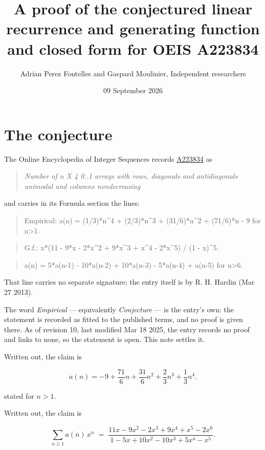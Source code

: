\documentclass[11pt]{article}
\title{A proof of the conjectured linear recurrence and generating function and closed form for OEIS A223834}
\author{Adrian Perez Fontelles and Gaspard Moulinier, Independent researchers}
\date{09 September 2026}
\theoremstyle{definition}
\begin{document}
\maketitle
\section{The conjecture}

The Online Encyclopedia of Integer Sequences records \href{https://oeis.org/A223834}{A223834} as

\begin{quote}\itshape Number of n X 4 0..1 arrays with rows, diagonals and antidiagonals unimodal and columns nondecreasing\end{quote}

and carries in its Formula section the lines:

\begin{quote}\ttfamily Empirical: a(n) = (1/3)*n\textasciicircum{}4 + (2/3)*n\textasciicircum{}3 + (31/6)*n\textasciicircum{}2 + (71/6)*n - 9 for n>1.\end{quote}

\begin{quote}\ttfamily G.f.: x*(11 - 9*x - 2*x\textasciicircum{}2 + 9*x\textasciicircum{}3 + x\textasciicircum{}4 - 2*x\textasciicircum{}5) / (1 - x)\textasciicircum{}5.\end{quote}

\begin{quote}\ttfamily a(n) = 5*a(n-1) - 10*a(n-2) + 10*a(n-3) - 5*a(n-4) + a(n-5) for n>6.\end{quote}

That line carries no separate signature; the entry itself is by R. H. Hardin (Mar 27 2013).

The word {\itshape Empirical} --- equivalently {\itshape Conjecture} --- is the entry's own: the statement is recorded as fitted to the published terms, and no proof is given there. As of revision 10, last modified Mar 18 2025, the entry records no proof and links to none, so the statement is open. This note settles it.

Written out, the claim is

\[a(n) = -9 + \frac{71}{6}n + \frac{31}{6}n^{2} + \frac{2}{3}n^{3} + \frac{1}{3}n^{4}.\]

stated for $n > 1$.

Written out, the claim is

\[\sum_{n \ge 1} a(n)\,x^n \;=\; \frac{11x - 9x^{2} - 2x^{3} + 9x^{4} + x^{5} - 2x^{6}}{1 - 5x + 10x^{2} - 10x^{3} + 5x^{4} - x^{5}}.\]
\end{document}
